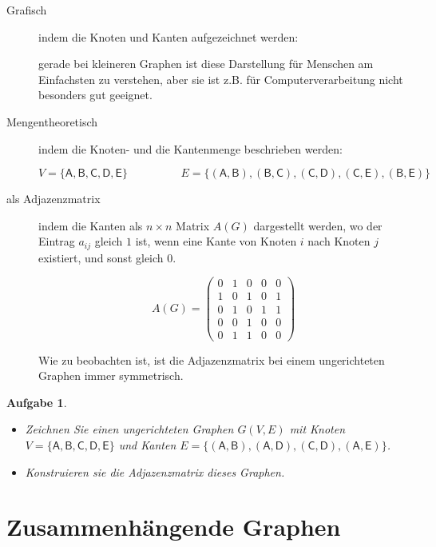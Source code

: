 \documentclass[12pt,a4paper]{report}
\theoremstyle{break}
\newtheorem{exercise}{Aufgabe}[section]
\theoremstyle{plain}
\begin{document}
\begin{description}
\item[Grafisch] indem die Knoten und Kanten aufgezeichnet werden:


gerade bei kleineren Graphen ist diese Darstellung f\"{u}r Menschen am
Einfachsten zu verstehen, aber sie ist z.B. f\"{u}r
Computerverarbeitung nicht besonders gut geeignet.
\item[Mengentheoretisch] indem die Knoten- und die Kantenmenge
  beschrieben werden:

\begin{displaymath}
V = \{\mathsf{A,B,C,D,E}\}\hspace{2cm}E = \{\mathsf{(A,B), (B,C),
  (C,D), (C,E), (B,E)}\}
\end{displaymath}

\item[\textnormal{als} Adjazenzmatrix] indem die Kanten als $n\times{n}$ Matrix $A(G)$
  dargestellt werden, wo der Eintrag $a_{ij}$ gleich $1$ ist, wenn eine Kante
  von Knoten $i$ nach Knoten $j$ existiert, und sonst gleich $0$.

\begin{displaymath}
A(G) = \left( 
\begin{array}{ccccc}
0 & 1 & 0 & 0 & 0 \\
1 & 0 & 1 & 0 & 1 \\
0 & 1 & 0 & 1 & 1 \\
0 & 0 & 1 & 0 & 0 \\
0 & 1 & 1 & 0 & 0 
\end{array}
\right)
\end{displaymath}

Wie zu beobachten ist, ist die Adjazenzmatrix bei einem ungerichteten
Graphen immer symmetrisch.
\end{description}

\begin{exercise}
\begin{itemize}
\item Zeichnen Sie einen ungerichteten Graphen $G(V,E)$ mit Knoten 
$V = \{\mathsf{A,B,C,D,E}\}$ und Kanten 
$E = \{\mathsf{(A, B), (A, D), (C, D), (A, E)}\}$.
\item Konstruieren sie die Adjazenzmatrix dieses Graphen.
\end{itemize}
\end{exercise}

\section{Zusammenh\"{a}ngende Graphen}
\end{document}
